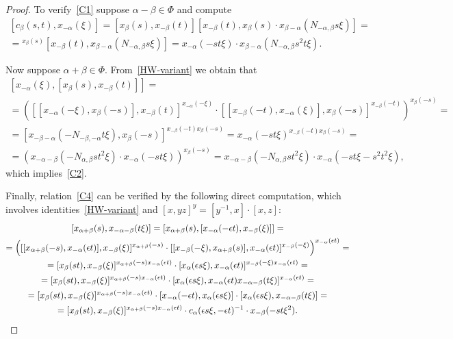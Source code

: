 \documentclass[oneside, 8pt]{amsart}
\theoremstyle{remark}
\theoremstyle{definition}
\numberwithin{equation}{section}
\begin{document}
\begin{proof}
To verify~\eqref{C1} suppose $\alpha - \beta \in \Phi$ and compute
\begin{multline} \nonumber [c_{\beta}(s, t), x_{-\alpha}(\xi)]  = [x_{\beta}(s), x_{-\beta}(t)] [x_{-\beta}(t), x_{\beta}(s)\cdot x_{\beta-\alpha}(N_{-\alpha, \beta} s\xi)] = \\
 = {}^{x_\beta(s)}\![x_{-\beta}(t), x_{\beta-\alpha}(N_{-\alpha, \beta}s\xi)] = x_{-\alpha}(- st\xi) \cdot x_{\beta-\alpha}(N_{-\alpha,\beta}s^2t\xi). \end{multline}

Now suppose $\alpha+\beta \in \Phi$. From~\eqref{HW-variant} we obtain that \begin{multline} \nonumber
[x_{-\alpha}(\xi), [x_\beta(s), x_{-\beta}(t)]] = \\ 
= \left([[ x_{-\alpha}(-\xi), x_\beta(-s)], x_{-\beta}(t)] ^ {x_{-\alpha}(-\xi)} \cdot  [[ x_{-\beta}(-t), x_{-\alpha}(\xi)], x_\beta(-s)] ^ {x_{-\beta}(-t)}\right)^{x_\beta(-s)} =  \\ = [x_{-\beta-\alpha}(-N_{-\beta,-\alpha}t\xi), x_\beta(-s)] ^ {x_{-\beta}(-t) x_\beta(-s)} = x_{-\alpha}(-st\xi) ^ {x_{-\beta}(-t) x_\beta(-s)} = \\
= (x_{-\alpha-\beta}(-N_{\alpha, \beta}st^2\xi) \cdot x_{-\alpha}(-st\xi))^{x_\beta(-s)} = x_{-\alpha-\beta}(-N_{\alpha, \beta}st^2\xi) \cdot x_{-\alpha}(-st\xi - s^2t^2\xi),
\end{multline} which implies~\eqref{C2}.

Finally, relation~\eqref{C4} can be verified by the following direct computation, which involves identities~\eqref{HW-variant} and $[x, yz]^y = [y^{-1}, x] \cdot [x, z]$:
\begin{multline} \nonumber [x_{\alpha+\beta}(s), x_{-\alpha-\beta}(t\xi)] = [x_{\alpha+\beta}(s), [x_{-\alpha}(-\epsilon t), x_{-\beta}(\xi)]] = \\ 
= \left([[ x_{\alpha+\beta}(-s), x_{-\alpha}(\epsilon t)], x_{-\beta}(\xi)] ^ {x_{\alpha+\beta}(-s)} \cdot  [[ x_{-\beta}(-\xi), x_{\alpha+\beta}(s)], x_{-\alpha}(\epsilon t)] ^ {x_{-\beta}(-\xi)}\right)^{x_{-\alpha}(\epsilon t)} = \\
= [x_{\beta}(st), x_{-\beta}(\xi)] ^ {x_{\alpha+\beta}(-s) x_{-\alpha}(\epsilon t)} \cdot  [ x_{\alpha}(\epsilon s\xi), x_{-\alpha}(\epsilon t)] ^ {x_{-\beta}(-\xi)x_{-\alpha}(\epsilon t)}  = \\
= [x_{\beta}(st), x_{-\beta}(\xi)] ^ {x_{\alpha+\beta}(-s) x_{-\alpha}(\epsilon t)} \cdot  [ x_{\alpha}(\epsilon s\xi), x_{-\alpha}(\epsilon t) x_{-\alpha-\beta}(t\xi)] ^ {x_{-\alpha}(\epsilon t)} = \\
= [x_{\beta}(st), x_{-\beta}(\xi)] ^ {x_{\alpha+\beta}(-s) x_{-\alpha}(\epsilon t)} \cdot  [x_{-\alpha}(-\epsilon t), x_{\alpha}(\epsilon s\xi)] \cdot [x_{\alpha}(\epsilon s\xi), x_{-\alpha-\beta}(t\xi)] = \\
= [x_{\beta}(st), x_{-\beta}(\xi)] ^ {x_{\alpha+\beta}(-s) x_{-\alpha}(\epsilon t)} \cdot c_{\alpha}(\epsilon s\xi, -\epsilon t)^{-1} \cdot x_{-\beta}(-st\xi^2). \qedhere
\end{multline}


\end{proof}
\end{document}
